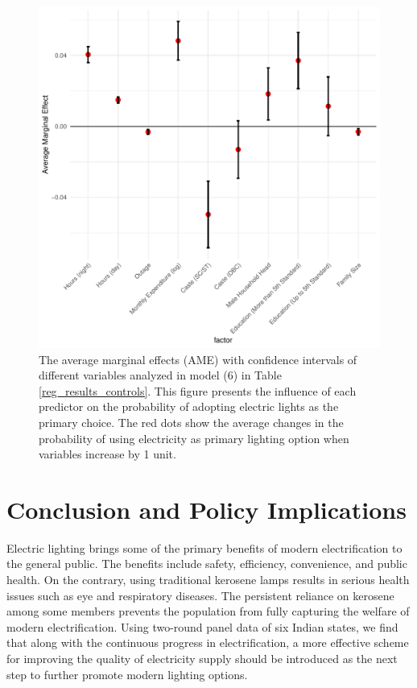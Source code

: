 \documentclass[11pt,english]{article}
\theoremstyle{plain} \newtheorem{claim}{Claim}
\theoremstyle{plain} \newtheorem{prop}{Proposition}
\theoremstyle{plain} \newtheorem{hypo}{Hypothesis}
\begin{document}
\begin{figure}[h!]
\centering
\includegraphics[scale=1]{Figures/AME.pdf}
\caption{The average marginal effects (AME) with confidence intervals of different variables analyzed in model (6) in Table \ref{reg_results_controls}. This figure presents the influence of each predictor on the probability of adopting electric lights as the primary choice. The red dots show the average changes in the probability of using electricity as primary lighting option when variables increase by 1 unit.}
\label{AME}
\end{figure}

\section{Conclusion and Policy Implications}

Electric lighting brings some of the primary benefits of modern electrification to the general public. The benefits include safety, efficiency, convenience, and public health. On the contrary, using traditional kerosene lamps results in serious health issues such as eye and respiratory diseases. The persistent reliance on kerosene among some members prevents the population from fully capturing the welfare of modern electrification. Using two-round panel data of six Indian states, we find that along with the continuous progress in electrification, a more effective scheme for improving the quality of electricity supply should be introduced as the next step to further promote modern lighting options.
\end{document}

